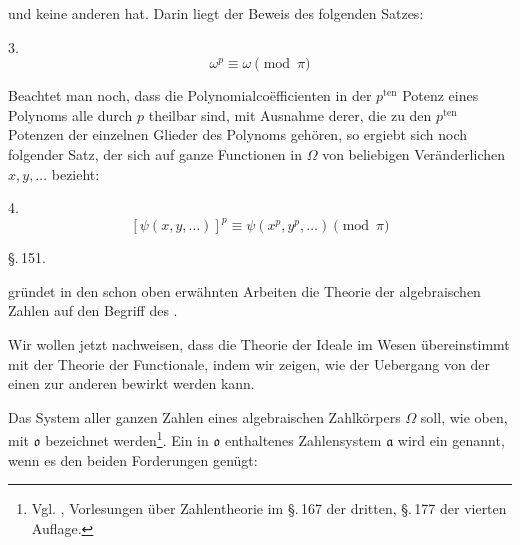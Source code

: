 und keine anderen hat. Darin liegt der Beweis des folgenden Satzes:

3. 
\[ \omega^p \equiv \omega \pmod{\pi} \]

Beachtet man noch, dass die Polynomialcoëfficienten in der $p^{\text{ten}}$ Potenz eines Polynoms alle durch $p$ theilbar sind, mit Ausnahme derer, die zu den $p^{\text{ten}}$ Potenzen der einzelnen Glieder des Polynoms gehören, so ergiebt sich noch folgender Satz, der sich auf ganze Functionen in $\Omega$ von beliebigen Veränderlichen $x, y, \ldots$ bezieht:

4. 
\[ [\psi(x,y,\ldots)]^p \equiv \psi(x^p, y^p, \ldots) \pmod{\pi} \]

\begin{center}
\S.\,151.\\
\end{center}

 gründet in den schon oben erwähnten Arbeiten die Theorie der algebraischen Zahlen auf den Begriff des .

Wir wollen jetzt nachweisen, dass die Theorie der Ideale im Wesen übereinstimmt mit der Theorie der Functionale, indem wir zeigen, wie der Uebergang von der einen zur anderen bewirkt werden kann.

Das System aller ganzen Zahlen eines algebraischen Zahlkörpers $\Omega$ soll, wie oben, mit $\mathfrak{o}$ bezeichnet werden\footnote{Vgl. , Vorlesungen über Zahlentheorie im \S.\,167 der dritten, \S.\,177 der vierten Auflage.}. Ein in $\mathfrak{o}$ enthaltenes Zahlensystem $\mathfrak{a}$ wird ein  genannt, wenn es den beiden Forderungen genügt:
